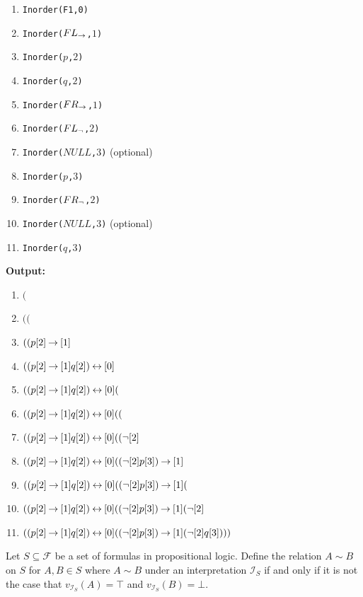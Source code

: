 \documentclass[]{exam}
\begin{document}
\begin{questions}
\begin{solution}
\begin{multicols}{2}
\begin{enumerate}
\item \texttt{Inorder(F1,0)}
\item \texttt{Inorder($FL_{\mathbin{\rightarrow}}$,$1$)}
\item \texttt{Inorder($p$,$2$)}
\item \texttt{Inorder($q$,$2$)}
\item \texttt{Inorder($FR_{\mathbin{\rightarrow}}$,$1$)}
\item \texttt{Inorder($FL_{\mathop{\neg}}$,$2$)}
\item \texttt{Inorder($NULL$,$3$)} (optional) 
\item \texttt{Inorder($p$,$3$)}
\item \texttt{Inorder($FR_{\mathop{\neg}}$,$2$)}
\item \texttt{Inorder($NULL$,$3$)} (optional) 
\item \texttt{Inorder($q$,$3$)}
\end{enumerate}
\columnbreak
{ \bf Output:}
\begin{enumerate}
\item $($
\item $(($
\item $((p[2] \mathbin{\rightarrow}[1]$
\item $((p[2] \mathbin{\rightarrow}[1] q[2]) \mathbin{\leftrightarrow}[0] $
\item $((p[2] \mathbin{\rightarrow}[1] q[2]) \mathbin{\leftrightarrow}[0] ($
\item $((p[2] \mathbin{\rightarrow}[1] q[2]) \mathbin{\leftrightarrow}[0] (($
\item $((p[2] \mathbin{\rightarrow}[1] q[2]) \mathbin{\leftrightarrow}[0] ((\mathop{\neg} [2]$
\item $((p[2] \mathbin{\rightarrow}[1] q[2]) \mathbin{\leftrightarrow}[0] ((\mathop{\neg} [2] p[3]) \mathbin{\rightarrow} [1] $
\item $((p[2] \mathbin{\rightarrow}[1] q[2]) \mathbin{\leftrightarrow}[0] ((\mathop{\neg} [2] p[3]) \mathbin{\rightarrow} [1] ($
\item $((p[2] \mathbin{\rightarrow}[1] q[2]) \mathbin{\leftrightarrow}[0] ((\mathop{\neg} [2] p[3]) \mathbin{\rightarrow} [1] (\mathop{\neg} [2] $
\item $((p[2] \mathbin{\rightarrow}[1] q[2]) \mathbin{\leftrightarrow}[0] ((\mathop{\neg} [2] p[3]) \mathbin{\rightarrow} [1] (\mathop{\neg} [2] q[3])))$
\end{enumerate}

\end{multicols}

\end{solution}
\question Let $S \subseteq \mathcal{F}$ be a set of formulas in propositional logic.
Define the relation $A\sim B$ on $S$ for $A,B \in S$ where $A\sim B$ under
an interpretation $\mathcal{I}_S$ if and only if it is not the case that
$v_{\mathcal{I}_S}(A) = \top$ and $v_{\mathcal{I}_S}(B) = \bot$.
\end{questions}
\end{document}
